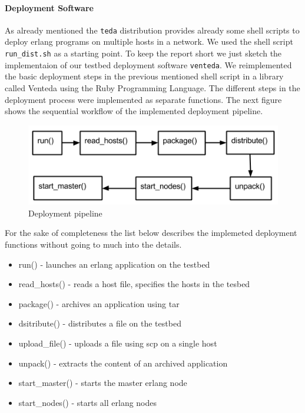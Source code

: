 \documentclass[10pt,a4paper]{article}
\begin{document}
\paragraph{Deployment Software}
As already mentioned the \texttt{teda} distribution provides already some shell scripts to deploy erlang programs on multiple hosts in a network. We used the shell script \texttt{run\_dist.sh} as a starting point. To keep the report short we just sketch the implementaion of our testbed deployment software \texttt{venteda}.
We reimplemented the basic deployment steps in the previous mentioned shell script in a library called Venteda using the Ruby Programming Language. The different steps in the deployment process were implemented as separate functions.
The next figure shows the sequential workflow of the implemented deployment pipeline.
\begin{figure}[!htb]
\centering
\includegraphics[scale=0.5]{png/deployment_process.png}
\caption{Deployment pipeline} 
\end{figure}


For the sake of completeness the list below describes the implemeted deployment functions without going to much into the details.
\begin{itemize}
\itemsep0em
\item run() - launches an erlang application on the testbed 
\item read\_hosts() - reads a host file, specifies the hosts in the tesbed
\item package() - archives an application using tar
\item dsitribute() -  distributes a file on the testbed
\item upload\_file() - uploads a file using scp on a single host
\item unpack() - extracts the content of an archived application
\item start\_master() - starts the master erlang node
\item start\_nodes() - starts all erlang nodes

\end{itemize}
\end{document}
